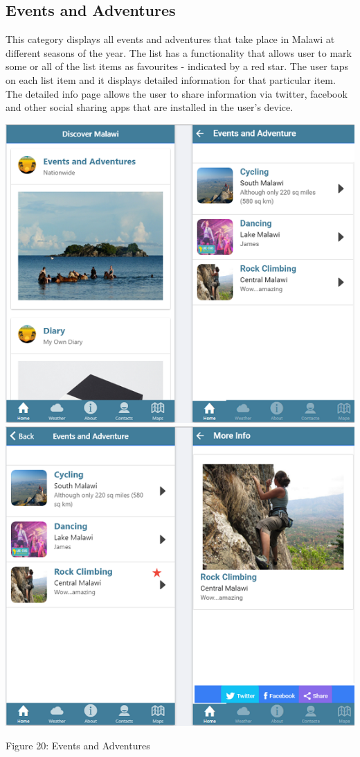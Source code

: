 \paragraph{}

\subsection{Events and Adventures}
This category displays all events and adventures that take place in Malawi at different seasons of the year. The list has a functionality that allows user to mark some or all of the list items as favourites - indicated by a red star. The user taps on each list item and it displays detailed information for that particular item. The detailed info page allows the user to share information via twitter, facebook and other social sharing apps that are installed in the user’s device.

\begin{center}    
	\includegraphics{img/events.png}
	\includegraphics{img/events2.png}
\end{center}
\begin{center}
	Figure 20: Events and Adventures 
\end{center}

